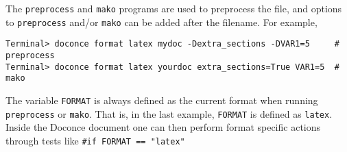 \documentclass[%
oneside,                 %
final,                   %
10pt]{article}
\begin{document}
The {\fontsize{10pt}{10pt}\Verb!preprocess!} and {\fontsize{10pt}{10pt}\Verb!mako!} programs are used to preprocess the
file, and options to {\fontsize{10pt}{10pt}\Verb!preprocess!} and/or {\fontsize{10pt}{10pt}\Verb!mako!} can be added after the
filename. For example,
\vspace{4pt}
\begin{Verbatim}[numbers=none,frame=lines,label=\fbox{{\tiny Terminal}},fontsize=\fontsize{9pt}{9pt},
labelposition=topline,framesep=2.5mm,framerule=0.7pt]
Terminal> doconce format latex mydoc -Dextra_sections -DVAR1=5     # preprocess
Terminal> doconce format latex yourdoc extra_sections=True VAR1=5  # mako
\end{Verbatim}
The variable {\fontsize{10pt}{10pt}\Verb!FORMAT!} is always defined as the current format when
running {\fontsize{10pt}{10pt}\Verb!preprocess!} or {\fontsize{10pt}{10pt}\Verb!mako!}. That is, in the last example, {\fontsize{10pt}{10pt}\Verb!FORMAT!} is
defined as {\fontsize{10pt}{10pt}\Verb!latex!}. Inside the Doconce document one can then perform
format specific actions through tests like {\fontsize{10pt}{10pt}\Verb!#if FORMAT == "latex"!}
\end{document}
